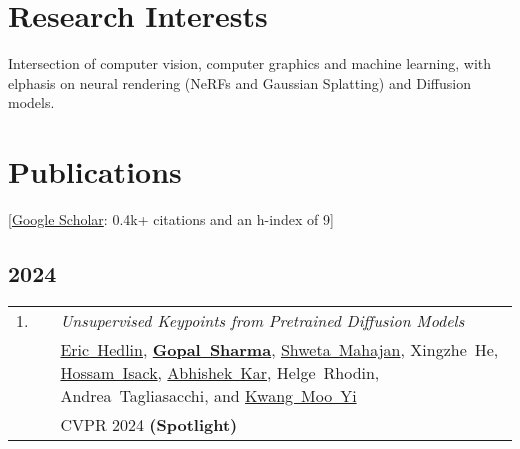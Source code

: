 \documentclass[11pt,letter,sans]{moderncv}
\begin{document}
\section{Research Interests}
Intersection of computer vision, computer graphics and machine learning, with elphasis on neural rendering (NeRFs and Gaussian Splatting) and Diffusion models.


\section{Publications}
\vspace{-8.2mm}\hspace{30mm}[\href{https://scholar.google.com/citations?user=Oe3bmrQAAAAJ}{Google Scholar}: 0.4k+ citations and an h-index of 9]\vspace{3mm}


\setlength\fboxsep{2pt}



\subsection{2024}
\begin{minipage}{\textwidth}
  \begin{tabular}[t]{p{8mm}p{1mm}>{\raggedright\arraybackslash}p{6.5in}}
   \hfill1.\hspace*{1mm} && \textit{Unsupervised Keypoints from Pretrained Diffusion Models}  \\
   && \mbox{\href{}{Eric Hedlin}}, \mbox{\textbf{\href{hippogriff.github.io}{Gopal Sharma}}}, \mbox{\href{}{Shweta Mahajan}}, \mbox{Xingzhe He}, \mbox{\href{}{Hossam Isack}}, \mbox{\href{}{Abhishek Kar}}, \mbox{Helge Rhodin}, \mbox{Andrea Tagliasacchi}, and \mbox{\href{}{Kwang Moo Yi}} \\
   && CVPR 2024 \textbf{(Spotlight)} \\
  \end{tabular} \\[2mm]
  \end{minipage}
  
\end{document}
